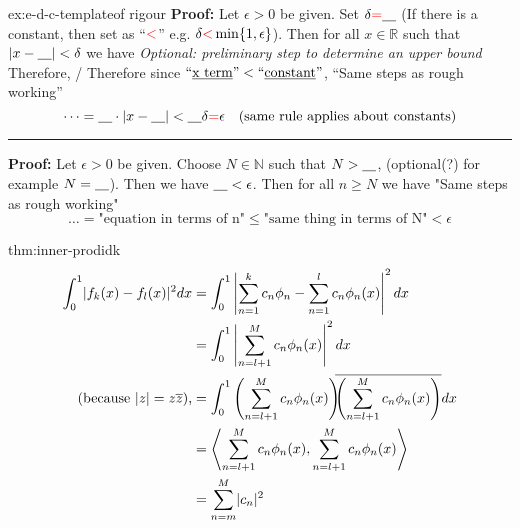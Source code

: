 \documentclass[landscape, 8pt]{extarticle}
\begin{document}
\begin{multicols}{3}
\begin{xmp}{ex:e-d-c-template}{of rigour}
	\vspace{5pt}
    \textbf{Proof:} Let $\epsilon > 0$ be given. Set $\delta {\color{red}=}\text{\underline{\quad}}$ (If there is a constant, then set as ``${\color{red}<}$'' e.g. $\delta {\color{red}<}\min\{1,\epsilon\}$). Then for all $x\in \mathbb{R}$ such that $\lvert x - \text{\underline{\quad}}\rvert < \delta$ we have
    \textit{Optional: preliminary step to determine an upper bound}
    \vspace{0pt}\newline
    Therefore, / Therefore since $\text{``\underline{x term}''} < \text{``\underline{constant}''}$,
    \vspace{0pt}\newline
    ``Same steps as rough working''
    \[\dots = \text{\underline{\quad}} \cdot \lvert x - \text{\underline{\quad}}\rvert < \text{\underline{\quad}}\delta {\color{red}=} \epsilon \quad\text{(same rule applies about constants)}\]
    \hrule
    \vspace{3pt}
    \noindent\textbf{Proof:} Let $\epsilon > 0$ be given. Choose $N\in \mathbb{N}$ such that $N > \text{\underline{\quad}}$, (optional(?) for example $N=\text{\underline{\quad}}$). Then we have $\text{\underline{\quad}}<\epsilon$. Then for all $n\ge N$ we have
    \vspace{0pt}\newline
    "Same steps as rough working"
    \[\dots = \text{"equation in terms of n"} \le \text{"same thing in terms of N"} < \epsilon\]
\end{xmp}

\begin{thm}{thm:inner-prod}{idk}
	\begin{align*}
		\int_{0}^{1} \lvert f_{k}(x) - f_{l}(x) \rvert^{2} dx &= \int_{0}^{1} \left\lvert \sum_{n = 1}^{k} c_{n}\phi_{n} - \sum_{n = 1}^{l} c_{n}\phi_{n}(x) \right\rvert ^{2} dx\\
															  &= \int_{0}^{1} \left\lvert \sum_{n = l+1}^{M} c_{n}\phi_{n}(x) \right\rvert^{2} dx\\
		\text{(because $\lvert z \rvert = z \overline{z}$),} &= \int_{0}^{1} \left(\sum_{n = l+1}^{M} c_{n}\phi_{n}(x)\right)\hspace{-5pt}\overline{\left(\sum_{n = l+1}^{M} c_{n}\phi_{n}(x)\right)} dx\\
															 &= \left\langle \sum_{n = l+1}^{M} c_{n}\phi_{n}(x),\sum_{n = l+1}^{M} c_{n}\phi_{n}(x) \right\rangle\\
															 &= \sum_{n = m}^{M} \lvert c_{n} \rvert^{2}
	\end{align*}
\end{thm}




\end{multicols}
\end{document}
